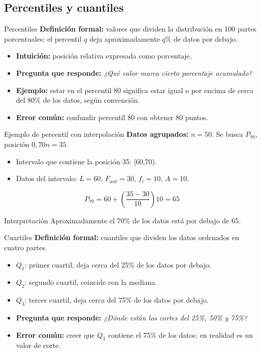 \documentclass[aspectratio=169,11pt]{beamer}
\newcommand{\pregunta}[1]{\textbf{Pregunta que responde:} \emph{#1}}
\newcommand{\errorcomun}[1]{\textbf{Error común:} #1}
\begin{document}
\subsection{Percentiles y cuantiles}

\begin{frame}{Percentiles}
\textbf{Definición formal:} valores que dividen la distribución en 100 partes porcentuales; el percentil $q$ deja aproximadamente $q\%$ de datos por debajo.
\begin{itemize}
  \item \textbf{Intuición:} posición relativa expresada como porcentaje.
  \item \pregunta{¿Qué valor marca cierto porcentaje acumulado?}
  \item \textbf{Ejemplo:} estar en el percentil 80 significa estar igual o por encima de cerca del 80\% de los datos, según convención.
  \item \errorcomun{confundir percentil 80 con obtener 80 puntos.}
\end{itemize}
\end{frame}

\begin{frame}{Ejemplo de percentil con interpolación}
\textbf{Datos agrupados:} $n=50$. Se busca $P_{70}$, posición $0{,}70n=35$.
\begin{itemize}
  \item Intervalo que contiene la posición 35: [60,70).
  \item Datos del intervalo: $L=60$, $F_{ant}=30$, $f_i=10$, $A=10$.
\end{itemize}
\[
P_{70}=60+\left(\frac{35-30}{10}\right)10=65
\]
\begin{block}{Interpretación}
Aproximadamente el 70\% de los datos está por debajo de 65.
\end{block}
\end{frame}

\begin{frame}{Cuartiles}
\textbf{Definición formal:} cuantiles que dividen los datos ordenados en cuatro partes.
\begin{itemize}
  \item $Q_1$: primer cuartil, deja cerca del 25\% de los datos por debajo.
  \item $Q_2$: segundo cuartil, coincide con la mediana.
  \item $Q_3$: tercer cuartil, deja cerca del 75\% de los datos por debajo.
  \item \pregunta{¿Dónde están los cortes del 25\%, 50\% y 75\%?}
  \item \errorcomun{creer que $Q_3$ contiene el 75\% de los datos; en realidad es un valor de corte.}
\end{itemize}
\end{frame}
\end{document}
